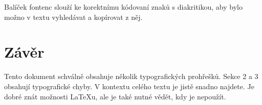 \documentclass[10pt, a4paper, twocolumn]{article}
\begin{document}
Balíček fontenc slouží ke korektnímu kódovaní znaků s diakritikou, aby bylo možno v textu vyhledávat a kopírovat z něj.


\section{Závěr}

Tento dokument schválně obsahuje několik typografických prohřešků.
Sekce 2 a 3 obsahují typografické chyby.
V kontextu celého textu je jistě snadno najdete.
Je dobré znát možnosti LaTeXu, ale je také nutné vědět, kdy je nepoužít.
\end{document}
